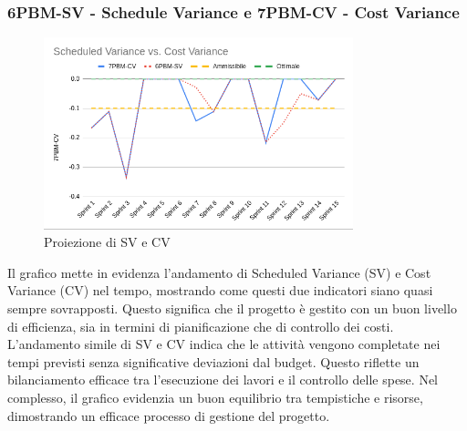 \documentclass{article}
\begin{document}
        \subsubsection{6PBM-SV - Schedule Variance e 7PBM-CV - Cost Variance}
        \begin{figure}[H]
            \centering
            \includegraphics[width=0.8\textwidth]{../../../img/pdq_charts/chart3-proiezioneSVCV.png}
            \caption{Proiezione di SV e CV}
        \end{figure}
        Il grafico mette in evidenza l’andamento di Scheduled Variance (SV) e Cost Variance (CV) nel tempo, mostrando come questi due indicatori siano quasi sempre sovrapposti. Questo significa che il progetto è gestito con un buon livello di efficienza, sia in termini di pianificazione che di controllo dei costi.
        L’andamento simile di SV e CV indica che le attività vengono completate nei tempi previsti senza significative deviazioni dal budget. Questo riflette un bilanciamento efficace tra l’esecuzione dei lavori e il controllo delle spese.
        Nel complesso, il grafico evidenzia un buon equilibrio tra tempistiche e risorse, dimostrando un efficace processo di gestione del progetto.
\end{document}
